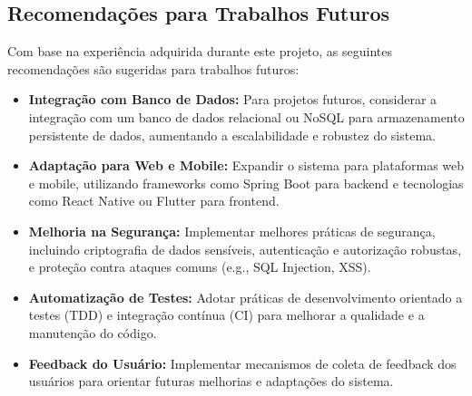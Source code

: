 \documentclass[../main.tex]{subfiles}
\begin{document}
\subsection{Recomendações para Trabalhos Futuros}
Com base na experiência adquirida durante este projeto, as seguintes recomendações são sugeridas para trabalhos futuros:

\begin{itemize}
    \item \textbf{Integração com Banco de Dados:} Para projetos futuros, considerar a integração com um banco de dados relacional ou NoSQL para armazenamento persistente de dados, aumentando a escalabilidade e robustez do sistema.
    \item \textbf{Adaptação para Web e Mobile:} Expandir o sistema para plataformas web e mobile, utilizando frameworks como Spring Boot para backend e tecnologias como React Native ou Flutter para frontend.
    \item \textbf{Melhoria na Segurança:} Implementar melhores práticas de segurança, incluindo criptografia de dados sensíveis, autenticação e autorização robustas, e proteção contra ataques comuns (e.g., SQL Injection, XSS).
    \item \textbf{Automatização de Testes:} Adotar práticas de desenvolvimento orientado a testes (TDD) e integração contínua (CI) para melhorar a qualidade e a manutenção do código.
    \item \textbf{Feedback do Usuário:} Implementar mecanismos de coleta de feedback dos usuários para orientar futuras melhorias e adaptações do sistema.
\end{itemize}

\end{document}
